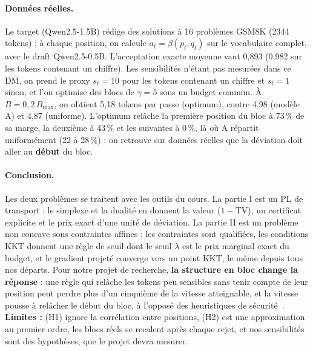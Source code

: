 \documentclass[11pt,a4paper]{article}
\newcommand{\TV}{\mathrm{TV}}
\theoremstyle{plain}
\begin{document}
\paragraph{Données réelles.} Le target (Qwen2.5-1.5B) rédige des solutions à 16 problèmes GSM8K (2344 tokens) ; à chaque position, on calcule $a_t=\beta(p_t,q_t)$ sur le vocabulaire complet, avec le draft Qwen2.5-0.5B. L'acceptation exacte moyenne vaut 0,893 (0,982 sur les tokens contenant un chiffre). Les sensibilités n'étant pas mesurées dans ce DM, on prend le proxy $s_t=10$ pour les tokens contenant un chiffre et $s_t=1$ sinon, et l'on optimise des blocs de $\gamma=5$ sous un budget commun. À $B=0{,}2\,B_{\max}$, on obtient 5,18 tokens par passe (optimum), contre 4,98 (modèle A) et 4,87 (uniforme). L'optimum relâche la première position du bloc à 73\,\% de sa marge, la deuxième à 43\,\% et les suivantes à 0\,\%, là où A répartit uniformément (22 à 28\,\%) : on retrouve sur données réelles que la déviation doit aller au \textbf{début} du bloc.

\paragraph{Conclusion.} Les deux problèmes se traitent avec les outils du cours. La partie I est un PL de transport : le simplexe et la dualité en donnent la valeur ($1-\TV$), un certificat explicite et le prix exact d'une unité de déviation. La partie II est un problème non concave sous contraintes affines : les contraintes sont qualifiées, les conditions KKT donnent une règle de seuil dont le seuil $\lambda$ est le prix marginal exact du budget, et le gradient projeté converge vers un point KKT, le même depuis tous nos départs. Pour notre projet de recherche, \textbf{la structure en bloc change la réponse} : une règle qui relâche les tokens peu sensibles sans tenir compte de leur position peut perdre plus d'un cinquième de la vitesse atteignable, et la vitesse pousse à relâcher le début du bloc, à l'opposé des heuristiques de sécurité~\cite{secure}.
\textbf{Limites :} (H1) ignore la corrélation entre positions, (H2) est une approximation au premier ordre, les blocs réels se recalent après chaque rejet, et nos sensibilités sont des hypothèses, que le projet devra mesurer.

\appendix
\end{document}
